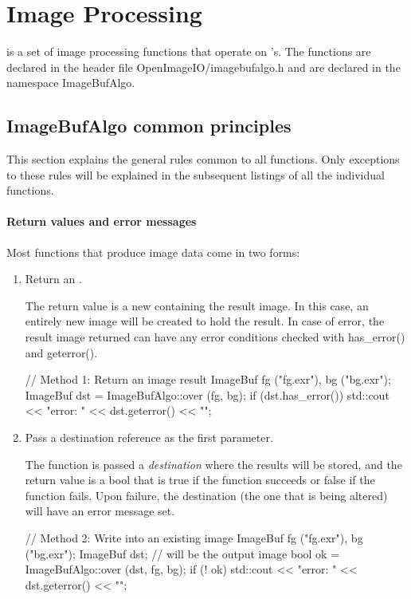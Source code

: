 \chapter{Image Processing}
\label{chap:imagebufalgo}

\IBA is a set of image processing functions that operate on \ImageBuf's.
The functions are declared in the header file
{\cf OpenImageIO/imagebufalgo.h} and are declared in
the {\cf namespace ImageBufAlgo}.


\section{ImageBufAlgo common principles}
\label{sec:iba:intro}

This section explains the general rules common to all \ImageBufAlgo
functions. Only exceptions to these rules will be explained in the
subsequent listings of all the individual \IBA functions.


\subsubsection*{Return values and error messages}

Most \IBA functions that produce image data come in two forms:

\begin{enumerate}
\item Return an \ImageBuf.

The return value is a new \ImageBuf containing the result image. In this
case, an entirely new image will be created to hold the result. In case of
error, the result image returned can have any error conditions checked with
{\cf has_error()} and {\cf geterror()}.

\begin{code}
    // Method 1: Return an image result
    ImageBuf fg ("fg.exr"), bg ("bg.exr");
    ImageBuf dst = ImageBufAlgo::over (fg, bg);
    if (dst.has_error())
        std::cout << "error: " << dst.geterror() << "\n";
\end{code}


\item Pass a destination \ImageBuf reference as the first parameter.

The function is passed a \emph{destination} \ImageBuf where the results will
be stored, and the return value is a {\cf bool} that is {\cf true} if the
function succeeds or {\cf false} if the function fails. Upon failure, the
destination \ImageBuf (the one that is being altered) will have an error
message set.

\begin{code}
    // Method 2: Write into an existing image
    ImageBuf fg ("fg.exr"), bg ("bg.exr");
    ImageBuf dst;   // will be the output image
    bool ok = ImageBufAlgo::over (dst, fg, bg);
    if (! ok)
        std::cout << "error: " << dst.geterror() << "\n";
\end{code}

\end{enumerate}

